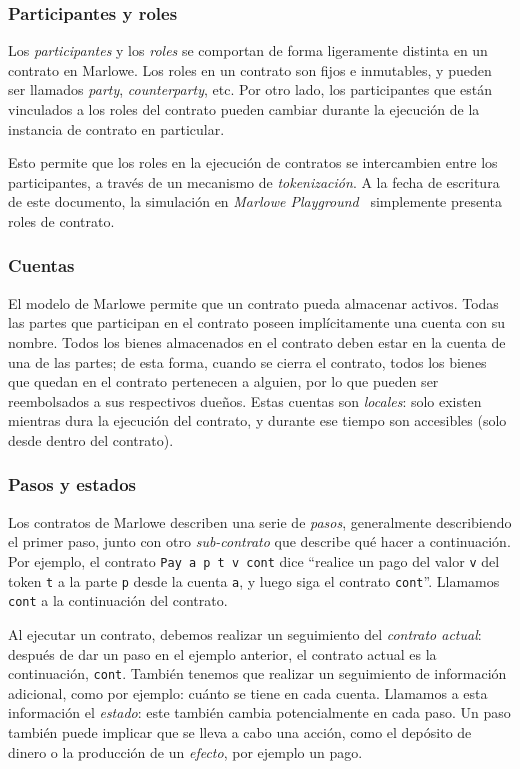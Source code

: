 \documentclass[12pt]{book}
\begin{document}
\subsubsection{Participantes y roles}
Los \textit{participantes} y los \textit{roles} se comportan de forma ligeramente distinta en un contrato en Marlowe. Los roles en un contrato son fijos e inmutables, y pueden ser llamados \textit{party}, \textit{counterparty}, etc. Por otro lado, los participantes que están vinculados a los roles del contrato pueden cambiar durante la ejecución de la instancia de contrato en particular.

Esto permite que los roles en la ejecución de contratos se intercambien entre los participantes, a través de un mecanismo de \textit{tokenización}. A la fecha de escritura de este documento, la simulación en \textit{Marlowe Playground}~\cite{marlowe_playground} simplemente presenta roles de contrato.

\subsubsection{Cuentas}
El modelo de Marlowe permite que un contrato pueda almacenar activos. Todas las partes que participan en el contrato poseen implícitamente una cuenta con su nombre. Todos los bienes almacenados en el contrato deben estar en la cuenta de una de las partes; de esta forma, cuando se cierra el contrato, todos los bienes que quedan en el contrato pertenecen a alguien, por lo que pueden ser reembolsados a sus respectivos dueños. Estas cuentas son \textit{locales}: solo existen mientras dura la ejecución del contrato, y durante ese tiempo son accesibles (solo desde dentro del contrato).

\subsubsection{Pasos y estados}
Los contratos de Marlowe describen una serie de \textit{pasos}, generalmente describiendo el primer paso, junto con otro \textit{sub-contrato} que describe qué hacer a continuación. Por ejemplo, el contrato \texttt{Pay a p t v cont} dice ``realice un pago del valor \texttt{v} del token \texttt{t} a la parte \texttt{p} desde la cuenta \texttt{a}, y luego siga el contrato \texttt{cont}''. Llamamos \texttt{cont} a la continuación del contrato.

Al ejecutar un contrato, debemos realizar un seguimiento del \textit{contrato actual}: después de dar un paso en el ejemplo anterior, el contrato actual es la continuación, \texttt{cont}. También tenemos que realizar un seguimiento de información adicional, como por ejemplo: cuánto se tiene en cada cuenta. Llamamos a esta información el \textit{estado}: este también cambia potencialmente en cada paso. Un paso también puede implicar que se lleva a cabo una acción, como el depósito de dinero o la producción de un \textit{efecto}, por ejemplo un pago.
\end{document}

